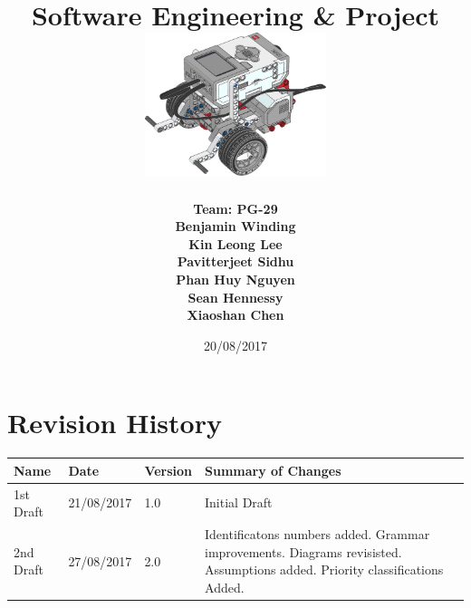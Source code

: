\documentclass[10pt,a4paper,titlepage]{article}
\begin{document}
	
	\begin{titlepage}
		
		\title{
			\fontsize{50}{12}\\
			\vspace{20pt}
			\fontsize{20}{12}\\
			\vspace{10pt}
			\large{Software Engineering \& Project} \\
			\vspace{20pt}
			\includegraphics[width=200px]{title-page-ev3.png}					
		}
		\date{20/08/2017}
		\author{
			\bf{Team: PG-29} \\
			Benjamin Winding \\
			Kin Leong Lee \\
			Pavitterjeet Sidhu \\
			Phan Huy Nguyen \\
			Sean Hennessy \\
			Xiaoshan Chen \\
		}
		\maketitle
		
	\end{titlepage}
		 
	\tableofcontents	
	\listoffigures
	
	
	\section*{Revision History}	
	\label{revtable}	
	\begin{tabular}{|p{2.1cm}|p{2.5cm}|p{2cm}|p{4.1cm}|}		
		\hline 
		\textbf {Name} & \textbf{Date} & \textbf {Version} &\textbf {Summary of Changes} \\ 
		\hline 
		1st Draft & 21/08/2017 & 1.0 & Initial Draft\\
		\hline
		2nd Draft & 27/08/2017 & 2.0 & Identificatons numbers added. Grammar improvements. Diagrams revisisted. Assumptions added. Priority classifications Added.\\ 
		\hline 		
	\end{tabular}
\end{document}
